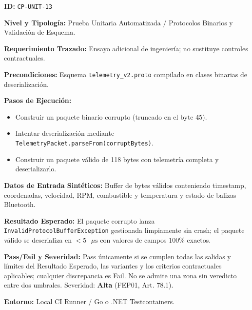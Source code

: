 \par\noindent\textbf{ID:} \texttt{CP-\allowbreak{}UNIT-\allowbreak{}13}\par
\par\noindent\textbf{Nivel y Tipología:} Prueba Unitaria Automatizada / Protocolos Binarios y Validación de Esquema.\par
\par\noindent\textbf{Requerimiento Trazado:} Ensayo adicional de ingeniería; no sustituye controles contractuales.\par
\par\noindent\textbf{Precondiciones:} Esquema \texttt{telemetry\_\allowbreak{}v2.proto} compilado en clases binarias de deserialización.\par
\par\noindent\textbf{Pasos de Ejecución:}\par
\begin{itemize}
\item Construir un paquete binario corrupto (truncado en el byte 45).
\item Intentar deserialización mediante \texttt{Telemetry\allowbreak{}Packet.\allowbreak{}parse\allowbreak{}From(\allowbreak{}corrupt\allowbreak{}Bytes)}.
\item Construir un paquete válido de 118 bytes con telemetría completa y deserializarlo.
\end{itemize}

\par\noindent\textbf{Datos de Entrada Sintéticos:} Buffer de bytes válidos conteniendo timestamp, coordenadas, velocidad, RPM, combustible y temperatura y estado de balizas Bluetooth.\par
\par\noindent\textbf{Resultado Esperado:} El paquete corrupto lanza \texttt{Invalid\allowbreak{}Protocol\allowbreak{}Buffer\allowbreak{}Exception} gestionada limpiamente sin crash; el paquete válido se deserializa en \(< 5\text{ }\mu\text{s}\) con valores de campos 100\% exactos.\par
\par\noindent\textbf{Pass/Fail y Severidad:} Pass únicamente si se cumplen todas las salidas y límites del Resultado Esperado, las variantes y los criterios contractuales aplicables; cualquier discrepancia es Fail. No se admite una zona sin veredicto entre dos umbrales. Severidad: \textbf{Alta} (FEP01, Art. 78.1).\par
\par\noindent\textbf{Entorno:} Local CI Runner / Go o .NET Testcontainers.\par


